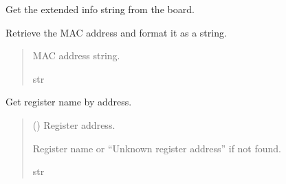 \documentclass[letterpaper,10pt,english]{sphinxmanual}
\begin{document}
\begin{fulllineitems}
\begin{fulllineitems}

\pysigstartsignatures
{}
\pysigstopsignatures
\sphinxAtStartPar
Get the extended info string from the board.

\end{fulllineitems}



\begin{fulllineitems}

\pysigstartsignatures
{}
\pysigstopsignatures
\sphinxAtStartPar
Retrieve the MAC address and format it as a string.
\begin{quote}\begin{description}
\sphinxAtStartPar
MAC address string.

\sphinxAtStartPar
str

\end{description}\end{quote}

\end{fulllineitems}



\begin{fulllineitems}

\pysigstartsignatures
{}
\pysigstopsignatures
\sphinxAtStartPar
Get register name by address.
\begin{quote}\begin{description}
\sphinxAtStartPar
{} () \textendash{} Register address.

\sphinxAtStartPar
Register name or “Unknown register address” if not found.

\sphinxAtStartPar
str

\end{description}\end{quote}

\end{fulllineitems}




\end{fulllineitems}
\end{document}

